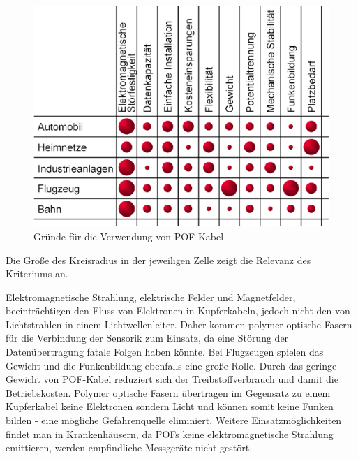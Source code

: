 \begin{figure}[h]
    \begin{center}
        \begin{minipage}[t]{\textwidth}
            \begin{center}
                \includegraphics[height=0.2\textheight]{Bilder/Optische_Wellenleiter_Die_Polymer_Optische_Faser/Allgemeines/pofgrund.png}
                \caption[Gründe für die Verwendung von POF-Kabel \newline \url{http://www.pofac.fh-nuernberg.de/pofac/de/was_sind_pof/images/warum_pof.png} (zuletzt aufgerufen am 19.09.2015)]{Gründe für die Verwendung von POF-Kabel}
                \label{fig:pofgrund}
            \end{center}
        \end{minipage}
    \end{center}
\end{figure}

Die Größe des Kreisradius in der jeweiligen Zelle zeigt die Relevanz des
Kriteriums an.

Elektromagnetische Strahlung, elektrische Felder und Magnetfelder,
beeinträchtigen den Fluss von Elektronen in Kupferkabeln, jedoch nicht den von
Lichtstrahlen in einem Lichtwellenleiter. Daher kommen polymer optische Fasern
für die Verbindung der Sensorik zum Einsatz, da eine Störung der
Datenübertragung fatale Folgen haben könnte. Bei Flugzeugen spielen das Gewicht
und die Funkenbildung ebenfalls eine große Rolle. Durch das geringe Gewicht von
POF-Kabel reduziert sich der Treibstoffverbrauch und damit die Betriebskosten.
Polymer optische Fasern übertragen im Gegensatz zu einem Kupferkabel keine
Elektronen sondern Licht und können somit keine Funken bilden - eine mögliche
Gefahrenquelle eliminiert. Weitere Einsatzmöglichkeiten findet man in
Krankenhäusern, da POFs keine elektromagnetische Strahlung emittieren, werden
empfindliche Messgeräte nicht gestört.
